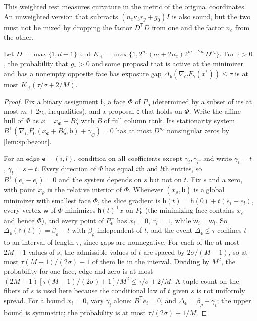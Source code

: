 This weighted test measures curvature in the metric of the original
coordinates. An unweighted version that subtracts $(n_c\kappa_3r_y+g_0)I$ is
also sound, but the two must not be mixed by dropping the factor $D^{\mathsf
T}D$ from one and the factor $n_c$ from the other.

\begin{lemma}\label{lem:con:order-tail}
Let $D=\max\{1,d-1\}$ and
$K_\preceq=\max\{1,2^{n_z}(m+2n_c)2^{m+2n_c}D^{n_c}\}$. For $\tau>0$, the
probability that $g_*>0$ and some proposal that is active at the minimizer and
has a nonempty opposite face has exposure gap
$\Delta_{\mathsf e}(\nabla_CF_\gamma(x^*))\le\tau$ is at most
$K_\preceq(\tau/\sigma+2/M)$.
\end{lemma}

\begin{proof}
Fix a binary assignment $\mathsf b$, a face $\Phi$ of $P_{\mathsf b}$ (determined
by a subset of its at most $m+2n_c$ inequalities), and a proposal $\mathsf e$
that holds on $\Phi$. Write the affine hull of $\Phi$ as $x=x_\Phi+B\zeta$ with
$B$ of full column rank. Its stationarity system
$B^{\mathsf T}(\nabla_CF_0(x_\Phi+B\zeta,\mathsf b)+\gamma_C)=0$ has at most
$D^{n_c}$ nonsingular zeros by \cref{lem:sp:bezout}.

For an edge $\mathsf e=(i,l)$, condition on all coefficients except
$\gamma_i,\gamma_l$, and write $\gamma_i=t$, $\gamma_l=s-t$. Every direction of
$\Phi$ has equal $i$th and $l$th entries, so $B^{\mathsf T}(e_i-e_l)=0$ and the
system depends on $s$ but not on $t$. Fix $s$ and a zero, with point
$x_\rho$ in the relative interior of $\Phi$. Whenever $(x_\rho,\mathsf b)$ is a
global minimizer with smallest face $\Phi$, the slice gradient is
$\mathsf h(t)=\mathsf h(0)+t(e_i-e_l)$, every vertex $\mathsf w$ of $\Phi$
minimizes $\mathsf h(t)^{\mathsf T}x$ on $P_{\mathsf b}$ (the minimizing face contains
$x_\rho$ and hence $\Phi$), and every point of $P_{\mathsf e}^-$ has $x_i=0$,
$x_l=1$, while $\mathsf w_i=\mathsf w_l$. So
$\Delta_{\mathsf e}(\mathsf h(t))=\beta_\rho-t$ with $\beta_\rho$ independent of
$t$, and the event $\Delta_{\mathsf e}\le\tau$ confines $t$ to an interval of
length $\tau$, since gaps are nonnegative. For each of the at most $2M-1$
values of $s$, the admissible values of $t$ are spaced by $2\sigma/(M-1)$, so
at most $\tau(M-1)/(2\sigma)+1$ of them lie in the interval. Dividing by $M^2$,
the probability for one face, edge and zero is at most
$(2M-1)[\tau(M-1)/(2\sigma)+1]/M^2\le\tau/\sigma+2/M$. A tuple-count on the
fibers of $s$ is used here because the conditional law of $t$ given $s$ is not
uniformly spread. For a bound $x_i=0$, vary $\gamma_i$ alone: $B^{\mathsf
T}e_i=0$, and $\Delta_{\mathsf e}=\beta_\rho+\gamma_i$; the upper bound is
symmetric; the probability is at most $\tau/(2\sigma)+1/M$.


\end{proof}
